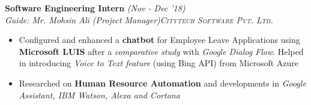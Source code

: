 \documentclass{article}
\begin{document}
\vspace{-5pt}
\textbf{Software Engineering Intern} \hfill{\sl \small (Nov - Dec '18)}
\vspace{-1pt}\\
{\it Guide: Mr. Mohsin Ali (Project Manager)}\hfill{\sl \small \textsc{Citytech Software Pvt. Ltd.}}\\
\vspace{-19pt}
\begin{itemize}[itemsep = -1.25 mm, leftmargin=*]
  \item Configured and enhanced a {\bf chatbot} for Employee Leave Applications using {\bf Microsoft LUIS} after a {\sl comparative study} with {\it Google Dialog Flow}. Helped in introducing \textsl{Voice to Text feature} (using Bing API) from Microsoft Azure
  \item Researched on {\bf Human Resource Automation} and developments in \textit{Google Assistant, IBM Watson, Alexa and Cortana}
\end{itemize}

\vspace{-20pt}
\end{document}
